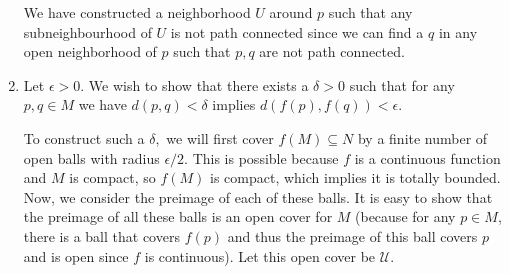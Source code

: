 \documentclass{article}
\numberwithin{equation}{section}
\begin{document}
\begin{enumerate}
    We have constructed a neighborhood $U$ around $p$ such that any subneighbourhood of $U$ is not path connected since we can find a $q$ in any open neighborhood of $p$ such that $p,q$ are not path connected.
    
    
    \newpage
    \item Let $\epsilon > 0.$ We wish to show that there exists a $\delta > 0$ such that for any $p,q\in M$ we have $d(p,q) < \delta$ implies $d(f(p),f(q)) < \epsilon.$
    
    To construct such a $\delta,$ we will first cover $f(M) \subseteq N$ by a finite number of open balls with radius $\epsilon/2.$ This is possible because $f$ is a continuous function and $M$ is compact, so $f(M)$ is compact, which implies it is totally bounded. Now, we consider the preimage of each of these balls. It is easy to show that the preimage of all these balls is an open cover for $M$ (because for any $p\in M$, there is a ball that covers $f(p)$ and thus the preimage of this ball covers $p$ and is open since $f$ is continuous). Let this open cover be $\mathcal{U}.$


\end{enumerate}
\end{document}
